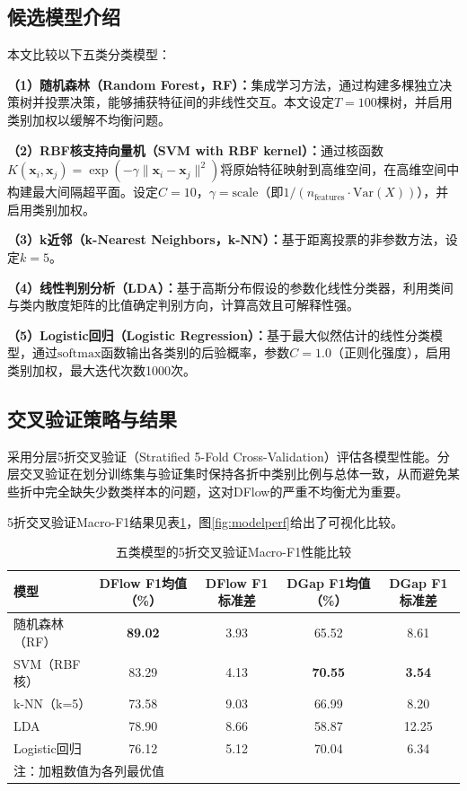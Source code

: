 \documentclass[UTF8,a4paper,12pt]{ctexart}
\begin{document}
\subsection{候选模型介绍}

本文比较以下五类分类模型：

\textbf{（1）随机森林（Random Forest，RF）：}集成学习方法，通过构建多棵独立决策树并投票决策，能够捕获特征间的非线性交互。本文设定$T=100$棵树，并启用类别加权以缓解不均衡问题。

\textbf{（2）RBF核支持向量机（SVM with RBF kernel）：}通过核函数$K(\bm{x}_i,\bm{x}_j)=\exp(-\gamma\|\bm{x}_i-\bm{x}_j\|^2)$将原始特征映射到高维空间，在高维空间中构建最大间隔超平面。设定$C=10$，$\gamma=\text{scale}$（即$1/(n_{\text{features}}\cdot\text{Var}(X))$），并启用类别加权。

\textbf{（3）k近邻（k-Nearest Neighbors，k-NN）：}基于距离投票的非参数方法，设定$k=5$。

\textbf{（4）线性判别分析（LDA）：}基于高斯分布假设的参数化线性分类器，利用类间与类内散度矩阵的比值确定判别方向，计算高效且可解释性强。

\textbf{（5）Logistic回归（Logistic Regression）：}基于最大似然估计的线性分类模型，通过$\text{softmax}$函数输出各类别的后验概率，参数$C=1.0$（正则化强度），启用类别加权，最大迭代次数1000次。

\subsection{交叉验证策略与结果}

采用分层5折交叉验证（Stratified 5-Fold Cross-Validation）评估各模型性能。分层交叉验证在划分训练集与验证集时保持各折中类别比例与总体一致，从而避免某些折中完全缺失少数类样本的问题，这对DFlow的严重不均衡尤为重要。

5折交叉验证Macro-F1结果见表\ref{tab:cv}，图\ref{fig:modelperf}给出了可视化比较。

\begin{table}[H]
\centering
\caption{五类模型的5折交叉验证Macro-F1性能比较}
\label{tab:cv}
\begin{tabular}{lcccc}
\toprule
模型 & DFlow F1均值（\%） & DFlow F1标准差 & DGap F1均值（\%） & DGap F1标准差 \\
\midrule
随机森林（RF） & \textbf{89.02} & 3.93 & 65.52 & 8.61 \\
SVM（RBF核） & 83.29 & 4.13 & \textbf{70.55} & \textbf{3.54} \\
k-NN（k=5） & 73.58 & 9.03 & 66.99 & 8.20 \\
LDA & 78.90 & 8.66 & 58.87 & 12.25 \\
Logistic回归 & 76.12 & 5.12 & 70.04 & 6.34 \\
\bottomrule
\multicolumn{5}{l}{\footnotesize 注：加粗数值为各列最优值}
\end{tabular}
\end{table}
\end{document}
